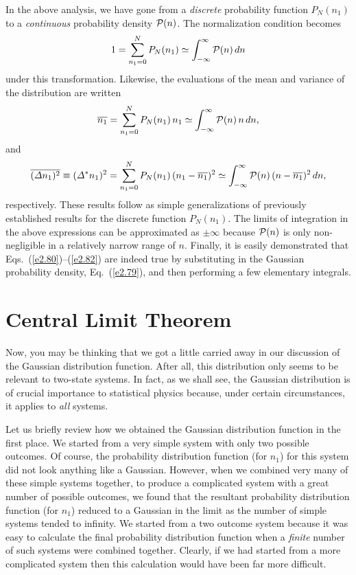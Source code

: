 In the above analysis, we have gone from a {\em discrete}\/ probability
function $P_N(n_1)$ to a {\em continuous}\/ probability density ${\cal P}(n)$.
The normalization condition becomes
\begin{equation}\label{e2.80}
1= \sum_{n_1=0}^N P_N(n_1) \simeq \int_{-\infty}^{\infty}{\cal P}(n)\, dn
\end{equation}
under this transformation. Likewise, the evaluations of the mean and
variance of the distribution are written
\begin{equation}
\overline{n_1} = \sum_{n_1=0}^N P_N(n_1)\,n_1 \simeq \int_{-\infty}^{\infty}
{\cal P}(n)\,n\,dn,
\end{equation}
and
\begin{equation}\label{e2.82}
\overline{({\mit\Delta} n_1)^2}\equiv
({\mit\Delta}^\ast n_1)^2 = \sum_{n_1=0}^N P_N(n_1)\,
(n_1-\overline{n_1})^2\simeq \int_{-\infty}^{\infty}{\cal P}(n)
\,(n-\overline{n_1})^2\,dn,
\end{equation}
respectively. These results 
follow as simple generalizations of previously established results for
the discrete function $P_N(n_1)$.
The limits of integration in the above expressions 
can be approximated as $\pm \infty$ because ${\cal P}(n)$ is only
non-negligible in a relatively narrow range of $n$.
Finally, it is easily demonstrated that Eqs.~(\ref{e2.80})--(\ref{e2.82}) are indeed
true by substituting in the Gaussian probability density,
Eq.~(\ref{e2.79}), and then performing a few elementary integrals.

\section{Central Limit Theorem}\label{s2.11}
Now, you may be thinking that we got a little carried away in our discussion of
the Gaussian distribution function.  
After all, this distribution  only seems to
be relevant  to two-state systems. In fact, as we shall see, the Gaussian 
distribution is of crucial importance to statistical physics because, under certain
circumstances, it applies to {\em all}\/ systems.

 Let us briefly  review how we
obtained the Gaussian distribution function in the
first place. We started from a
very simple system with only two possible outcomes. Of course, the
probability distribution function (for $n_1$) for this system did not look
anything like a Gaussian. However, when we combined very many
of these  simple systems together, 
to produce a complicated system with a great number of possible
outcomes, we found that the resultant probability distribution function 
(for $n_1$)
reduced to a
 Gaussian in the limit as the number of simple systems tended
 to infinity.
 We started from a two outcome
system because it was easy to calculate the final probability
distribution function  when a {\em finite}\/ number of such systems were
combined together. Clearly, if we had started  from a more complicated
 system then this calculation would have been
far more difficult.

